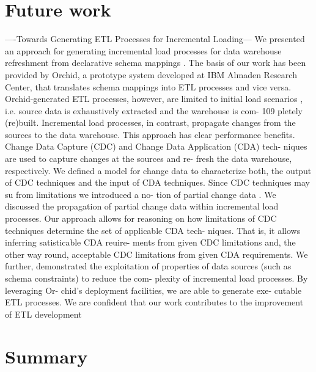 \section{Future work}

----Towards Generating ETL Processes for Incremental Loading---
We presented an approach for generating
incremental load
processes
for  data  warehouse  refreshment  from
declarative
schema mappings
.  The basis of our work has been provided
by Orchid, a prototype system developed at IBM Almaden
Research Center, that translates
schema mappings
into ETL
processes and vice versa.  Orchid-generated ETL processes,
however,  are  limited  to
initial  load  scenarios
,  i.e.  source
data  is  exhaustively  extracted  and  the  warehouse  is  com-
109
pletely  (re)built.   Incremental  load  processes,  in  contrast,
propagate changes from the sources to the data warehouse.
This approach has clear performance benefits.  Change Data
Capture (CDC) and Change Data Application (CDA) tech-
niques  are  used  to  capture  changes  at  the  sources  and  re-
fresh the data warehouse, respectively.  We defined a model
for
change  data
to  characterize  both,  the  output  of  CDC
techniques  and  the  input  of  CDA  techniques.   Since  CDC
techniques may su from limitations we introduced a no-
tion of
partial  change  data
.  We discussed the propagation
of  partial  change  data  within  incremental  load  processes.
Our  approach  allows  for  reasoning  on  how  limitations  of
CDC techniques determine the set of applicable CDA tech-
niques.  That is, it allows inferring satisticable CDA reuire-
ments from given CDC limitations and, the other way round,
acceptable CDC limitations from given CDA requirements.
We further, demonstrated the exploitation of properties of
data sources (such as schema constraints) to reduce the com-
plexity  of  incremental  load  processes.   By  leveraging  Or-
chid's  deployment  facilities,  we  are  able  to  generate  exe-
cutable  ETL  processes.   We  are  confident  that  our  work
contributes to the improvement of ETL development 




\section{Summary}
\label{summary}
